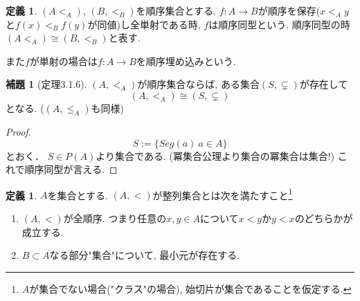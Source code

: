 \documentclass[dvipdfmx,a4paper,11pt]{article}
\theoremstyle{definition}
\newtheorem{lem}[thm]{補題}
\newtheorem{dfn}[thm]{定義}
\begin{document}
 \begin{tcolorbox}[colback = white, colframe = green!35!black, fonttitle = \bfseries,breakable = true]
 \begin{dfn}
 $(A <_A)$, $(B, <_B)$を順序集合とする.
 $f : A \to B$が順序を保存($x <_A y$と$f(x) <_B f(y)$が同値)し全単射である時, $f$は順序同型という. 順序同型の時 $(A <_A) \cong (B, <_B)$と表す. 
 
 また$f$が単射の場合は$f : A \to B$を順序埋め込みという. 
 \end{dfn}
 \end{tcolorbox}
 
  \begin{tcolorbox}
 [colback = white, colframe = green!35!black, fonttitle = \bfseries,breakable = true]
 \begin{lem}[定理3.1.6]
 $(A,<_A)$が順序集合ならば, ある集合$(S, \subsetneq)$が存在して
 $$
 (A,<_A) \cong (S, \subsetneq)
 $$
 となる. ($(A, \le_A)$も同様)
 \end{lem}
 \end{tcolorbox}
 \begin{proof}
 $$
 S := \{ Seg(a) \ a \in A\}
 $$
 とおく． $S \in P(A)$より集合である. (冪集合公理より集合の冪集合は集合!)
 これで順序同型が言える. 
 \end{proof}

 \begin{tcolorbox}
 [colback = white, colframe = green!35!black, fonttitle = \bfseries,breakable = true]
 \begin{dfn}
 $A$を集合とする. 
 $(A,<)$が整列集合とは次を満たすこと\footnote{$A$が集合でない場合("クラス"の場合), 始切片が集合であることを仮定する.}
 \begin{enumerate}
 \item  $(A,<)$が全順序. つまり任意の$x, y \in A$について$x <y$か$y < x$のどちらかが成立する.
 \item $B \subset A$なる部分"集合"について, 最小元が存在する. 
 \end{enumerate}
\end{dfn}
\end{tcolorbox}
\end{document}
